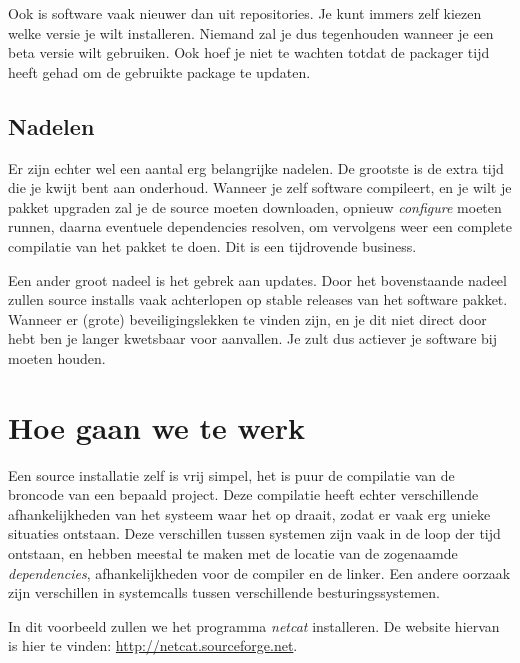 Ook is software vaak nieuwer dan uit repositories. Je kunt immers zelf kiezen welke versie je wilt installeren. Niemand zal je dus tegenhouden wanneer je een beta versie wilt gebruiken. Ook hoef je niet te wachten totdat de packager tijd heeft gehad om de gebruikte package te updaten. 

\subsection{Nadelen}
Er zijn echter wel een aantal erg belangrijke nadelen. De grootste is de extra tijd die je kwijt bent aan onderhoud. Wanneer je zelf software compileert, en je wilt je pakket upgraden zal je de source moeten downloaden, opnieuw \emph{configure} moeten runnen, daarna eventuele dependencies resolven, om vervolgens weer een complete compilatie van het pakket te doen. Dit is een tijdrovende business. 

Een ander groot nadeel is het gebrek aan updates. Door het bovenstaande nadeel zullen source installs vaak achterlopen op stable releases van het software pakket. Wanneer er (grote) beveiligingslekken te vinden zijn, en je dit niet direct door hebt ben je langer kwetsbaar voor aanvallen. Je zult dus actiever je software bij moeten houden. 

\section{Hoe gaan we te werk}
Een source installatie zelf is vrij simpel, het is puur de compilatie van de broncode van een bepaald project. Deze compilatie heeft echter verschillende afhankelijkheden van het systeem waar het op draait, zodat er vaak erg unieke situaties ontstaan. Deze verschillen tussen systemen zijn vaak in de loop der tijd ontstaan, en hebben meestal te maken met de locatie van de zogenaamde \emph{dependencies}, afhankelijkheden voor de compiler en de linker. Een andere oorzaak zijn verschillen in systemcalls tussen verschillende besturingssystemen. 

In dit voorbeeld zullen we het programma \emph{netcat} installeren. De website hiervan is hier te vinden: \url{http://netcat.sourceforge.net}. 

